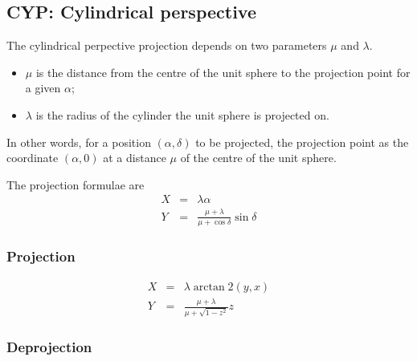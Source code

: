 \subsection{CYP: Cylindrical perspective}

  The cylindrical perpective projection depends on two parameters
  $\mu$ and $\lambda$.
  \begin{itemize}
    \item $\mu$ is the distance from the centre of the unit sphere to the projection point for a given $\alpha$;
    \item $\lambda$ is the radius of the cylinder the unit sphere is projected on.
  \end{itemize}  
  In other words, for a position $(\alpha, \delta)$ to be projected, the projection point
  as the coordinate $(\alpha, 0)$ at a distance $\mu$ of the centre of the unit sphere.

  The projection formulae are
  \begin{eqnarray}
    X & = & \lambda \alpha \\
    Y & = & \frac{\mu + \lambda}{\mu + \cos\delta} \sin\delta
  \end{eqnarray}

  \subsubsection{Projection}

    \begin{eqnarray}
      X & = & \lambda \arctan 2(y, x) \\
      Y & = & \frac{\mu + \lambda}{\mu + \sqrt{1 - z^2}} z
    \end{eqnarray}

  \subsubsection{Deprojection}

     


